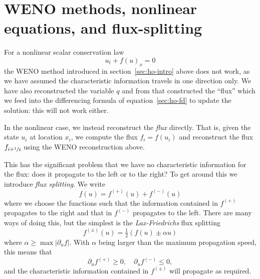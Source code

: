 
\section{WENO methods, nonlinear equations, and flux-splitting}
\label{sec:weno-burgers-fvs}


For a nonlinear scalar conservation law
\begin{equation}
  \label{eq:scalar_conslaw}
  u_t + f(u)_x = 0
\end{equation}
the WENO method introduced in section~\ref{sec:ho-intro} above does not work,
as we have assumed the characteristic
information travels in one direction only. We have also reconstructed the
variable $q$ and from that constructed the ``flux'' which we feed into the
differencing formula of equation~\eqref{sec:ho-fd} to update the solution: this
will not work either.

In the nonlinear case, we instead reconstruct the \emph{flux} directly. That
is, given the state $u_i$ at location $x_i$, we compute the flux $f_i = f(u_i)$
and reconstruct the flux $f_{i+{\sfrac{1}{2}}}$ using the WENO reconstruction above.

This has the significant problem that we have no characteristic information for
the flux: does it propagate to the left or to the right? To get around this we
introduce \emph{flux splitting}. We write
\begin{equation}
  \label{eq:flux-splitting}
  f(u) = f^{(+)}(u) + f^{(-)}(u)
\end{equation}
where we choose the functions such that the information contained in $f^{(+)}$
propagates to the right and that in $f^{(-)}$ propagates to the left. There are
many ways of doing this, but the simplest is the \emph{Lax-Friedrichs} flux
splitting
\begin{equation}
  \label{eq:lf-flux-split}
  f^{(\pm)}(u) = \tfrac{1}{2} \left( f(u) \pm \alpha u \right)
\end{equation}
where $\alpha \ge \max | \partial_u f |$. With $\alpha$ being larger than the maximum propagation speed, this means that
\begin{equation}
  \label{eq:lf-flux-split-speeds}
  \partial_u f^{(+)} \ge 0, \quad \partial_u f^{(-)} \le 0,
\end{equation}
and the characteristic information contained in $f^{(\pm)}$ will propagate as required.

